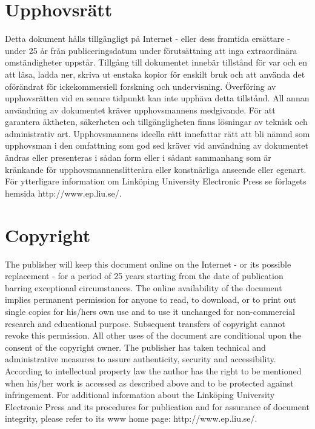 \section*{Upphovsrätt}
Detta dokument hålls tillgängligt på Internet - eller dess framtida ersättare - under 25 år från publiceringsdatum under förutsättning att inga extraordinära omständigheter uppstår. Tillgång till dokumentet innebär tillstånd för var och en att läsa, ladda ner, skriva ut enstaka kopior för enskilt bruk och att använda det oförändrat för ickekommersiell forskning och undervisning. Överföring av upphovsrätten vid en senare tidpunkt kan inte upphäva detta tillstånd. All annan användning av dokumentet kräver upphovsmannens medgivande. För att garantera äktheten, säkerheten och tillgängligheten finns lösningar av teknisk och administrativ art. Upphovsmannens ideella rätt innefattar rätt att bli nämnd som upphovsman i den omfattning som god sed kräver vid användning av dokumentet ändras eller presenteras i sådan form eller i sådant sammanhang som är kränkande för upphovsmannenslitterära eller konstnärliga anseende eller egenart. För ytterligare information om Linköping University Electronic Press se förlagets hemsida http://www.ep.liu.se/.

\section*{Copyright}
The publisher will keep this document online on the Internet - or its possible replacement - for a period of 25 years starting from the date of publication barring exceptional circumstances. The online availability of the document implies permanent permission for anyone to read, to download, or to print out single copies for his/hers own use and to use it unchanged for non-commercial research and educational purpose. Subsequent transfers of copyright cannot revoke this permission. All other uses of the document are conditional upon the consent of the copyright owner. The publisher has taken technical and administrative measures to assure authenticity, security and accessibility. According to intellectual property law the author has the right to be mentioned when his/her work is accessed as described above and to be protected against infringement. For additional information about the Linköping University Electronic Press and its procedures for publication and for assurance of document integrity, please refer to its www home page: http://www.ep.liu.se/.

